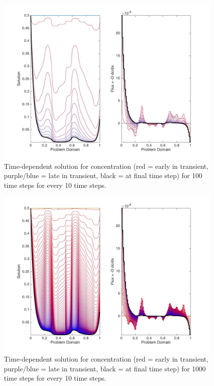 \documentclass[10pt]{article}
\begin{document}
\begin{figure}[H]
  \centering
  \includegraphics[width=16cm]{100.jpg}
  \caption{Time-dependent solution for concentration (red = early in transient, purple/blue = late in transient, black = at final time step) for 100 time steps for every 10 time steps.}
  \label{fig:100}
\end{figure}

\begin{figure}[H]
  \centering
  \includegraphics[width=16cm]{1000.jpg}
  \caption{Time-dependent solution for concentration (red = early in transient, purple/blue = late in transient, black = at final time step) for 1000 time steps for every 10 time steps.}
    \label{fig:1000}
\end{figure}
\end{document}
